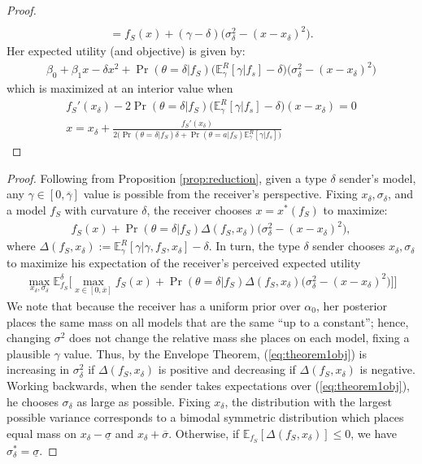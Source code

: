 \documentclass[11pt,dvipsnames]{article}
\begin{document}
\begin{appendix}
\begin{proof}
\begin{align*}
\\
= f_S(x)+(\gamma-\delta)\big(\sigma_\delta^2-(x-x_\delta)^2\big).
\end{align*}
Her expected utility (and objective) is given by:
\begin{align*}
\beta_0+\beta_1 x -\delta x^2 + \Pr(\theta=\delta|f_S)\big(\mathbb{E}_\gamma^R[\gamma|f_s]-\delta)\big(\sigma_\delta^2-(x-x_\delta)^2\big)	
\end{align*}
which is maximized at an interior value when
\begin{align*}
f_S'(x_\delta)-2\Pr(\theta=\delta|f_S)\big(\mathbb{E}_\gamma^R[\gamma|f_s]-\delta)(x-x_\delta)=0\\
x=x_\delta+\frac{f_S'(x_\delta)}{2\big(\Pr(\theta=\delta|f_S)\delta+\Pr(\theta=a|f_S)\mathbb{E}_\gamma^R[\gamma|f_s]\big)}
\end{align*}
\end{proof}

\sampling*
\begin{proof}
Following from Proposition \ref{prop:reduction}, given a type $\delta$ sender's model, any $\gamma \in [0,\overline{\gamma}]$ value is possible from the receiver's perspective.
Fixing $x_\delta,\sigma_\delta$, and a model $f_S$ with curvature $\delta$, the receiver chooses $x=x^*(f_S)$ to maximize:
\begin{align*}
f_S(x) + \Pr(\theta=\delta|f_S)\Delta(f_S,x_\delta)\big(\sigma_\delta^2-(x-x_\delta)^2\big),
\end{align*}
where $\Delta(f_S,x_\delta) := \mathbb{E}_\gamma^R[\gamma|\gamma,f_S,x_\delta]-\delta$.
In turn, the type $\delta$ sender chooses $x_\delta,\sigma_\delta$ to maximize his expectation of the receiver's perceived expected utility
\begin{align}
\max_{x_\delta,\sigma_\delta}
\mathbb{E}_{f_S}^\delta
\bigg[
\max_{x \in [0,\overline{x}]}
f_S(x) + \Pr(\theta=\delta|f_S)\Delta(f_S,x_\delta)\big(\sigma_\delta^2-(x-x_\delta)^2\big)
\big]\bigg]
\label{eq:theorem1obj}
\end{align}
We note that because the receiver has a uniform prior over $\alpha_0$, her posterior places the same mass on all models that are the same ``up to a constant''; hence, changing $\sigma^2$ does not change the relative mass she places on each model, fixing a plausible $\gamma$ value.
Thus, by the Envelope Theorem, (\ref{eq:theorem1obj}) is increasing in $\sigma_\delta^2$ if $\Delta(f_S,x_\delta)$ is positive and decreasing if $\Delta(f_S,x_\delta)$ is negative.
Working backwards, when the sender takes expectations over (\ref{eq:theorem1obj}), he chooses $\sigma_\delta$ as large as possible.
Fixing $x_\delta$, the distribution with the largest possible variance corresponds to a bimodal symmetric distribution which places equal mass on $x_\delta-\underline{\sigma}$ and $x_\delta+\overline{\sigma}$.
Otherwise, if $\mathbb{E}_{f_S}[\Delta(f_S,x_\delta)] \leq 0$, we have $\sigma_\delta^* = \underline{\sigma}$.


\end{proof}
\end{appendix}
\end{document}
